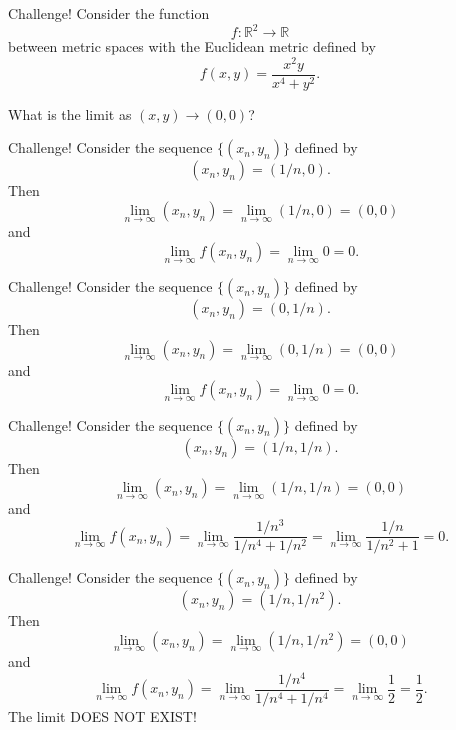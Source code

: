 \documentclass{beamer}
\begin{document}
\begin{frame}{Challenge!}
Consider the function
$$f: \mathbb{R}^2\rightarrow \mathbb R$$
between metric spaces with the Euclidean metric defined by
$$f(x,y) = \frac{x^2y}{x^4+y^2}.$$
\pause
\begin{quest}
\pause
What is the limit as $(x,y)\rightarrow (0,0)$?
\end{quest}
\end{frame}

\begin{frame}{Challenge!}
Consider the sequence $\{(x_n,y_n)\}$ defined by
$$(x_n,y_n) = (1/n,0).$$
\pause
Then
$$\lim_{n\rightarrow \infty} (x_n,y_n) = \lim_{n\rightarrow \infty} (1/n,0) = (0,0)$$
\pause
and
$$\lim_{n\rightarrow \infty} f(x_n,y_n) = \lim_{n\rightarrow \infty} 0 = 0.$$
\end{frame}

\begin{frame}{Challenge!}
Consider the sequence $\{(x_n,y_n)\}$ defined by
$$(x_n,y_n) = (0,1/n).$$
\pause
Then
$$\lim_{n\rightarrow \infty} (x_n,y_n) = \lim_{n\rightarrow \infty} (0,1/n) = (0,0)$$
\pause
and
$$\lim_{n\rightarrow \infty} f(x_n,y_n) = \lim_{n\rightarrow \infty} 0 = 0.$$
\end{frame}

\begin{frame}{Challenge!}
Consider the sequence $\{(x_n,y_n)\}$ defined by
$$(x_n,y_n) = (1/n,1/n).$$
\pause
Then
$$\lim_{n\rightarrow \infty} (x_n,y_n) = \lim_{n\rightarrow \infty} (1/n,1/n) = (0,0)$$
\pause
and
$$\lim_{n\rightarrow \infty} f(x_n,y_n) = \lim_{n\rightarrow \infty} \frac{1/n^3}{1/n^4+1/n^2} = \lim_{n\rightarrow \infty} \frac{1/n}{1/n^2+1} = 0.$$
\end{frame}

\begin{frame}{Challenge!}
Consider the sequence $\{(x_n,y_n)\}$ defined by
$$(x_n,y_n) = (1/n,1/n^2).$$
\pause
Then
$$\lim_{n\rightarrow \infty} (x_n,y_n) = \lim_{n\rightarrow \infty} (1/n,1/n^2) = (0,0)$$
\pause
and
$$\lim_{n\rightarrow \infty} f(x_n,y_n) = \lim_{n\rightarrow \infty} \frac{1/n^4}{1/n^4+1/n^4} = \lim_{n\rightarrow \infty} \frac{1}{2} = \frac{1}{2}.$$
\pause
{\color{red}The limit DOES NOT EXIST!}
\end{frame}
\end{document}
